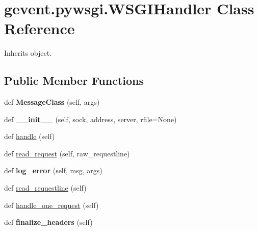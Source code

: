 \hypertarget{classgevent_1_1pywsgi_1_1_w_s_g_i_handler}{}\section{gevent.\+pywsgi.\+W\+S\+G\+I\+Handler Class Reference}
\label{classgevent_1_1pywsgi_1_1_w_s_g_i_handler}


Inherits object.

\subsection*{Public Member Functions}
\begin{DoxyCompactItemize}
\item 
\mbox{\label{classgevent_1_1pywsgi_1_1_w_s_g_i_handler_a99ad056e689846ff4074e5c51b7cf210}} 
def {\bfseries Message\+Class} (self, args)
\item 
\mbox{\label{classgevent_1_1pywsgi_1_1_w_s_g_i_handler_a7d51243db9d5c0945b3928da8ccc18e2}} 
def {\bfseries \+\_\+\+\_\+init\+\_\+\+\_\+} (self, sock, address, server, rfile=None)
\item 
def \hyperlink{classgevent_1_1pywsgi_1_1_w_s_g_i_handler_ab9d9fd3d969d84ea207bdf24ef98f695}{handle} (self)
\item 
def \hyperlink{classgevent_1_1pywsgi_1_1_w_s_g_i_handler_a103b72c59b3ba0c92b1046fc1904273a}{read\+\_\+request} (self, raw\+\_\+requestline)
\item 
\mbox{\label{classgevent_1_1pywsgi_1_1_w_s_g_i_handler_a46d81e44e608ef9a5d616d1bae3bce43}} 
def {\bfseries log\+\_\+error} (self, msg, args)
\item 
def \hyperlink{classgevent_1_1pywsgi_1_1_w_s_g_i_handler_ae871abaff811cd62b9f6d101dce8ed47}{read\+\_\+requestline} (self)
\item 
def \hyperlink{classgevent_1_1pywsgi_1_1_w_s_g_i_handler_a504e8333143cc425676c0ac25fba352b}{handle\+\_\+one\+\_\+request} (self)
\item 
\mbox{\label{classgevent_1_1pywsgi_1_1_w_s_g_i_handler_a19f0bb43a74381e415c0f1d19b4bb0a3}} 
def {\bfseries finalize\+\_\+headers} (self)

\end{DoxyCompactItemize}
